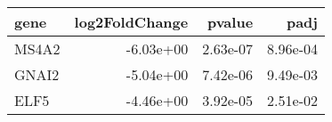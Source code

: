 \begin{tabular}{lrrr}
\toprule
 gene &  log2FoldChange &   pvalue &     padj \\
\midrule
MS4A2 &       -6.03e+00 & 2.63e-07 & 8.96e-04 \\
GNAI2 &       -5.04e+00 & 7.42e-06 & 9.49e-03 \\
 ELF5 &       -4.46e+00 & 3.92e-05 & 2.51e-02 \\
\bottomrule
\end{tabular}
